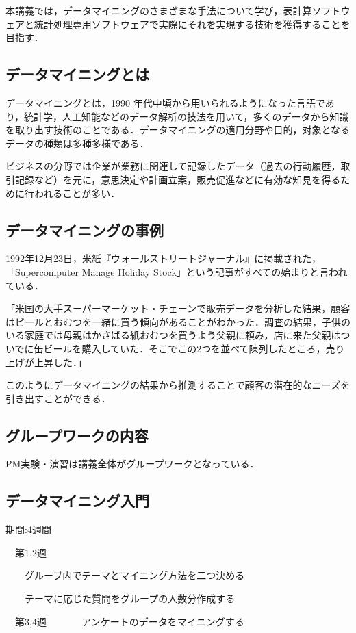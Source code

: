 本講義では，データマイニングのさまざまな手法について学び，表計算ソフトウェアと統計処理専用ソフトウェアで実際にそれを実現する技術を獲得することを目指す．

\subsection{データマイニングとは}

データマイニングとは，1990 年代中頃から用いられるようになった言語であり，統計学，人工知能などのデータ解析の技法を用いて，多くのデータから知識を取り出す技術のことである．データマイニングの適用分野や目的，対象となるデータの種類は多種多様である．

ビジネスの分野では企業が業務に関連して記録したデータ（過去の行動履歴，取引記録など）を元に，意思決定や計画立案，販売促進などに有効な知見を得るために行われることが多い．

\subsection{データマイニングの事例}
1992年12月23日，米紙『ウォールストリートジャーナル』に掲載された，「Supercomputer Manage Holiday Stock」という記事がすべての始まりと言われている．

「米国の大手スーパーマーケット・チェーンで販売データを分析した結果，顧客はビールとおむつを一緒に買う傾向があることがわかった．調査の結果，子供のいる家庭では母親はかさばる紙おむつを買うよう父親に頼み，店に来た父親はついでに缶ビールを購入していた．そこでこの2つを並べて陳列したところ，売り上げが上昇した．」

このようにデータマイニングの結果から推測することで顧客の潜在的なニーズを引き出すことができる．
\newpage
\subsection{グループワークの内容}

PM実験・演習は講義全体がグループワークとなっている．
\subsection{データマイニング入門}

期間:4週間

　第1,2週

　　グループ内でテーマとマイニング方法を二つ決める

　　テーマに応じた質問をグループの人数分作成する

　第3,4週
　
　　アンケートのデータをマイニングする

